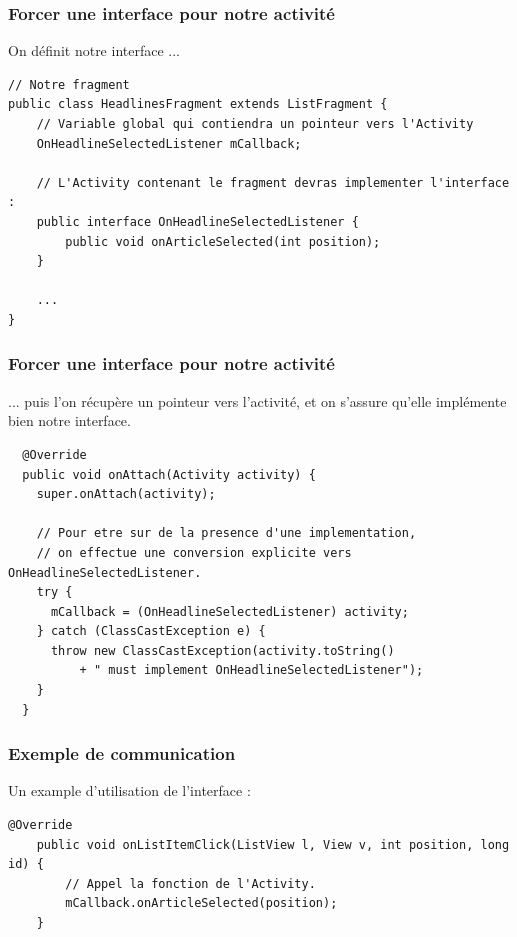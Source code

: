 \documentclass{beamer}
\begin{document}
\begin{frame}[fragile]
\frametitle{Forcer une interface pour notre activité}
\begin{block}{On définit notre interface ...}
\begin{lstlisting}
// Notre fragment
public class HeadlinesFragment extends ListFragment {
	// Variable global qui contiendra un pointeur vers l'Activity
    OnHeadlineSelectedListener mCallback;

    // L'Activity contenant le fragment devras implementer l'interface :
    public interface OnHeadlineSelectedListener {
        public void onArticleSelected(int position);
    }
    
    ...
}
\end{lstlisting}
\end{block}
\end{frame}


\begin{frame}[fragile]
\frametitle{Forcer une interface pour notre activité}
\begin{block}{... puis l'on récupère un pointeur vers l'activité, et on s'assure qu'elle implémente bien notre interface.}
\begin{lstlisting}
  @Override
  public void onAttach(Activity activity) {
    super.onAttach(activity);
        
    // Pour etre sur de la presence d'une implementation,
    // on effectue une conversion explicite vers OnHeadlineSelectedListener.
    try {
      mCallback = (OnHeadlineSelectedListener) activity;
    } catch (ClassCastException e) {
      throw new ClassCastException(activity.toString()
          + " must implement OnHeadlineSelectedListener");
    }
  }
\end{lstlisting}
\end{block}
\end{frame}
    
\begin{frame}[fragile]
\frametitle{Exemple de communication}
\begin{exampleblock}{Un example d'utilisation de l'interface :}
\begin{lstlisting}
@Override
    public void onListItemClick(ListView l, View v, int position, long id) {
        // Appel la fonction de l'Activity.
        mCallback.onArticleSelected(position);
    }
\end{lstlisting}
\end{exampleblock}
\end{frame}
\end{document}
